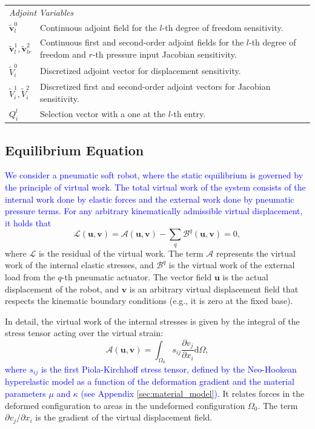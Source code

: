 \documentclass[journal]{IEEEtran}
\theoremstyle{definition}
\begin{document}
\begin{table}[h!]
\begin{tabular}{lp{5.5cm}}
\midrule
\multicolumn{2}{l}{\textit{Adjoint Variables}} \\
$\tilde{\mathbf{v}}^0_l$ & Continuous adjoint field for the $l$-th degree of freedom sensitivity. \\
$\tilde{\mathbf{v}}^1_l, \tilde{\mathbf{v}}^2_{lr}$ & Continuous first and second-order adjoint fields for the $l$-th degree of freedom and $r$-th pressure input Jacobian sensitivity. \\
$\tilde{V}_i^0$ & Discretized adjoint vector for displacement sensitivity. \\
$\tilde{V}_i^1, \tilde{V}_i^2$ & Discretized first and second-order adjoint vectors for Jacobian sensitivity. \\
$Q^l_i$ & Selection vector with a one at the $l$-th entry. \\
\bottomrule
\end{tabular}
\end{table}

\subsection{Equilibrium Equation}
\label{sec:sensitivity:equilibrium}
\textcolor{blue}{We consider a pneumatic soft robot, where the static equilibrium is governed by the principle of virtual work. The total virtual work of the system consists of the internal work done by elastic forces and the external work done by pneumatic pressure terms. For any arbitrary kinematically admissible virtual displacement, it holds that}
\begin{equation}
  \mathcal{L} \left(\mathbf{u}, \mathbf{v}\right) = \mathcal{A}\left(\mathbf{u}, \mathbf{v}\right) - \sum_q \mathcal{B}^q\left(\mathbf{u}, \mathbf{v}\right) = 0,
  \label{eq:virtual_work}
\end{equation}
where $\mathcal{L}$ is the residual of the virtual work. The term $\mathcal{A}$ represents the virtual work of the internal elastic stresses, and $\mathcal{B}^q$ is the virtual work of the external load from the $q$-th pneumatic actuator. The vector field $\mathbf{u}$ is the actual displacement of the robot, and $\mathbf{v}$ is an arbitrary virtual displacement field that respects the kinematic boundary conditions (e.g., it is zero at the fixed base).

In detail, the virtual work of the internal stresses is given by the integral of the stress tensor acting over the virtual strain:
\begin{equation}
  \mathcal{A}\left(\mathbf{u}, \mathbf{v}\right) = \int_{\Omega_0} s_{ij} \frac{\partial v_j}{\partial x_i} \mathrm{d}\Omega,
  \label{eq:structural_weak_form}
\end{equation}
\textcolor{blue}{where $s_{ij}$ is the first Piola-Kirchhoff stress tensor, defined by the Neo-Hookean hyperelastic model as a function of the deformation gradient and the material parameters $\mu$ and $\kappa$ (see Appendix \ref{sec:material_model})}. It relates forces in the deformed configuration to areas in the undeformed configuration $\Omega_0$. The term $\partial v_j / \partial x_i$ is the gradient of the virtual displacement field.
\end{document}
